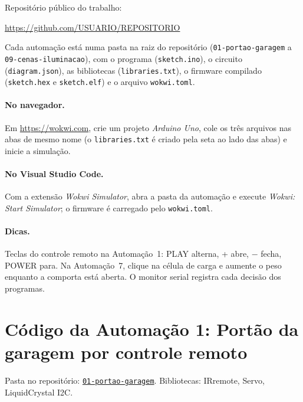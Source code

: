\documentclass[12pt]{article}
\newcommand{\repositorio}{https://github.com/USUARIO/REPOSITORIO}
\newcommand{\pasta}[1]{\href{\repositorio/tree/main/#1}{\texttt{#1}}}
\begin{document}
Repositório público do trabalho:

\begin{center}\url{https://github.com/USUARIO/REPOSITORIO}\end{center}

\noindent Cada automação está numa pasta na raiz do repositório (\texttt{01-portao-garagem} a \texttt{09-cenas-iluminacao}), com o programa (\texttt{sketch.ino}), o circuito (\texttt{diagram.json}), as bibliotecas (\texttt{libraries.txt}), o firmware compilado (\texttt{sketch.hex} e \texttt{sketch.elf}) e o arquivo \texttt{wokwi.toml}.

\paragraph{No navegador.} Em \url{https://wokwi.com}, crie um projeto \emph{Arduino Uno}, cole os três arquivos nas abas de mesmo nome (o \texttt{libraries.txt} é criado pela seta ao lado das abas) e inicie a simulação.

\paragraph{No Visual Studio Code.} Com a extensão \emph{Wokwi Simulator}, abra a pasta da automação e execute \emph{Wokwi: Start Simulator}; o firmware é carregado pelo \texttt{wokwi.toml}.

\paragraph{Dicas.} Teclas do controle remoto na Automação~1: PLAY alterna, + abre, $-$ fecha, POWER para. Na Automação~7, clique na célula de carga e aumente o peso enquanto a comporta está aberta. O monitor serial registra cada decisão dos programas.

\section{Código da Automação 1: Portão da garagem por controle remoto}

\noindent Pasta no repositório: \pasta{01-portao-garagem}. Bibliotecas: IRremote, Servo, LiquidCrystal I2C.
\end{document}
